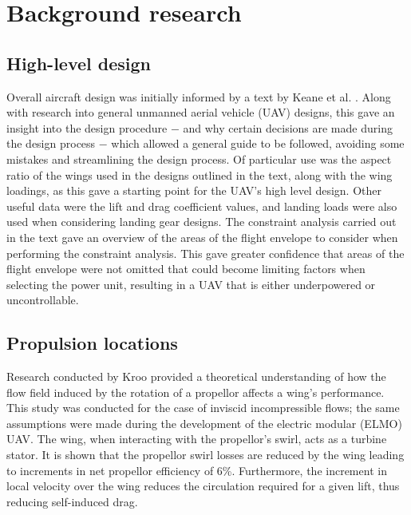 \documentclass[../../main.tex]{subfiles}
\begin{document}
\section{Background research} \label{sec:introduction:background-research}

\subsection{High-level design} \label{sec:introduction:background-research:high-level-design}


Overall aircraft design was initially informed by a text by Keane et al. \cite{keane-17}.
Along with research into general unmanned aerial vehicle (UAV) designs, this gave an insight into the design procedure $-$ and why certain decisions are made during the design process $-$ which allowed a general guide to be followed, avoiding some mistakes and streamlining the design process.
Of particular use was the aspect ratio of the wings used in the designs outlined in the text, along with the wing loadings, as this gave a starting point for the UAV's high level design.
Other useful data were the lift and drag coefficient values, and landing loads were also used when considering landing gear designs.
The constraint analysis carried out in the text gave an overview of the areas of the flight envelope to consider when performing the constraint analysis.
This gave greater confidence that areas of the flight envelope were not omitted that could become limiting factors when selecting the power unit, resulting in a UAV that is either underpowered or uncontrollable.

\subsection{Propulsion locations} \label{sec:introduction:background-research:propulsion-locations}


Research conducted by Kroo \cite{kroo-86} provided a theoretical understanding of how the flow field induced by the rotation of a propellor affects a wing's performance.
This study was conducted for the case of inviscid incompressible flows; the same assumptions were made during the development of the electric modular (ELMO) UAV.
The wing, when interacting with the propellor’s swirl, acts as a turbine stator.
It is shown that the propellor swirl losses are reduced by the wing leading to increments in net propellor efficiency of 6\%.
Furthermore, the increment in local velocity over the wing reduces the circulation required for a given lift, thus reducing self-induced drag. 
\end{document}
